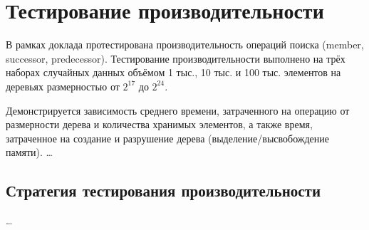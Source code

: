 \documentclass{article}
\begin{document}
\section{Тестирование производительности}
В рамках доклада протестирована производительность операций поиска (member, successor, predecessor). Тестирование производительности выполнено на трёх наборах случайных данных объёмом 1 тыс., 10 тыс. и 100 тыс. элементов на деревьях размерностью от $2^{17}$ до $2^{24}$.

Демонстрируется зависимость среднего времени, затраченного на операцию от размерности дерева и количества хранимых элементов, а также время, затраченное на создание и разрушение дерева (выделение/высвобождение памяти).
\dots
\subsection{Стратегия тестирования производительности}
\dots
\end{document}
